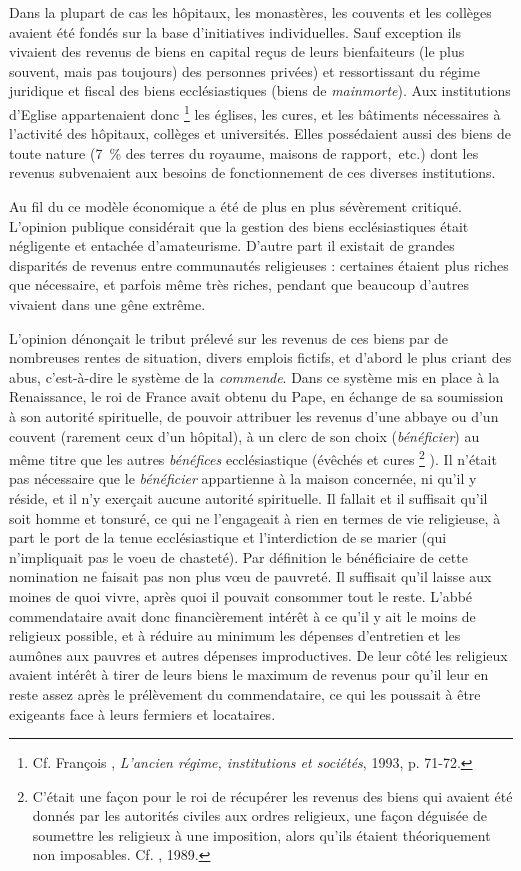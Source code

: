  Dans la plupart de cas les hôpitaux, les monastères, les couvents et les collèges avaient été fondés sur la base d'initiatives individuelles. Sauf exception ils vivaient des revenus de biens en capital reçus de leurs bienfaiteurs (le plus souvent, mais pas toujours) des personnes privées) et ressortissant du régime juridique et fiscal des biens ecclésiastiques (biens de \emph{mainmorte}). Aux institutions d'Eglise appartenaient donc%
\footnote{Cf. François , \emph{L'ancien régime, institutions et sociétés}, 1993, p. 71-72.} 
les églises, les cures, et les bâtiments nécessaires à l'activité des hôpitaux, collèges et universités. Elles possédaient aussi des biens de toute nature (7~\% des terres du royaume, maisons de rapport,~etc.) dont les revenus subvenaient aux besoins de fonctionnement de ces diverses institutions. 

 Au fil du  ce modèle économique a été de plus en plus sévèrement critiqué. L'opinion publique considérait que la gestion des biens ecclésiastiques était négligente et entachée d'amateurisme. D'autre part il existait de grandes disparités de revenus entre communautés religieuses : certaines étaient plus riches que nécessaire, et parfois même très riches, pendant que beaucoup d'autres vivaient dans une gêne extrême. 
 
 L'opinion dénonçait le tribut prélevé sur les revenus de ces biens par de nombreuses rentes de situation, divers emplois fictifs, et d'abord le plus criant des abus, c'est-à-dire le système de la \emph{commende}. Dans ce système mis en place à la Renaissance, le roi de France avait obtenu du Pape, en échange de sa soumission à son autorité spirituelle, de pouvoir attribuer les revenus d'une abbaye ou d'un couvent (rarement ceux d'un hôpital), à un clerc de son choix (\emph{bénéficier}) au même titre que les autres \emph{bénéfices} ecclésiastique (évêchés et cures%
\footnote{C'était une façon pour le roi de récupérer les revenus des biens qui avaient été donnés par les autorités civiles aux ordres religieux, une façon déguisée de soumettre les religieux à une imposition, alors qu'ils étaient théoriquement non imposables. Cf. , 1989.}%
). Il n'était pas nécessaire que le \emph{bénéficier} appartienne à la maison concernée, ni qu'il y réside, et il n'y exerçait aucune autorité spirituelle. Il fallait et il suffisait qu'il soit homme et tonsuré, ce qui ne l'engageait à rien en termes de vie religieuse, à part le port de la tenue ecclésiastique et l'interdiction de se marier (qui n'impliquait pas le voeu de chasteté). Par définition le bénéficiaire de cette nomination ne faisait pas non plus vœu de pauvreté. Il suffisait qu'il laisse aux moines de quoi vivre, après quoi il pouvait consommer tout le reste. L'abbé commendataire avait donc financièrement intérêt à ce qu'il y ait le moins de religieux possible, et à réduire au minimum les dépenses d'entretien et les aumônes aux pauvres et autres dépenses improductives. De leur côté les religieux avaient intérêt à tirer de leurs biens le maximum de revenus pour qu'il leur en reste assez après le prélèvement du commendataire, ce qui les poussait à être exigeants face à leurs fermiers et locataires. 

